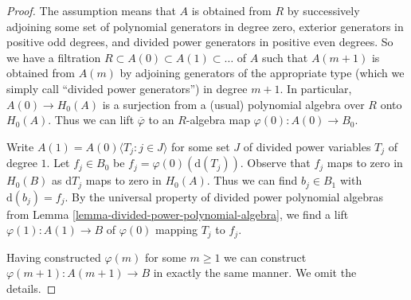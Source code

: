 \documentclass{stacks-project}
\theoremstyle{plain}
\theoremstyle{definition}
\theoremstyle{remark}
\numberwithin{equation}{subsection}
\begin{document}
\begin{proof}
The assumption means that $A$ is obtained from $R$ by successively adjoining
some set of polynomial generators in degree zero, exterior generators
in positive odd degrees, and divided power generators
in positive even degrees. So we have a filtration
$R \subset A(0) \subset A(1) \subset \ldots$
of $A$ such that $A(m + 1)$ is obtained from $A(m)$ by adjoining
generators of the appropriate type (which we simply call
``divided power generators'') in degree $m + 1$.
In particular, $A(0) \to H_0(A)$ is a surjection from a (usual) polynomial
algebra over $R$ onto $H_0(A)$. Thus we can lift $\overline{\varphi}$
to an $R$-algebra map $\varphi(0) : A(0) \to B_0$.

\medskip\noindent
Write $A(1) = A(0)\langle T_j:j\in J\rangle$ for some
set $J$ of divided power variables $T_j$ of degree $1$. Let $f_j \in B_0$
be $f_j = \varphi(0)(\text{d}(T_j))$. Observe that $f_j$
maps to zero in $H_0(B)$ as $\text{d}T_j$ maps to zero in $H_0(A)$.
Thus we can find $b_j \in B_1$ with $\text{d}(b_j) = f_j$.
By the universal property of divided power polynomial algebras from
Lemma \ref{lemma-divided-power-polynomial-algebra},
we find a lift $\varphi(1) : A(1) \to B$ of $\varphi(0)$
mapping $T_j$ to $f_j$.

\medskip\noindent
Having constructed $\varphi(m)$ for some $m \geq 1$ we can construct
$\varphi(m + 1) : A(m + 1) \to B$ in exactly the same manner.
We omit the details.
\end{proof}
\end{document}
